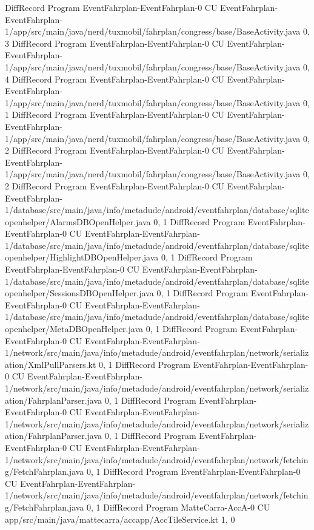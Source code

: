 DiffRecord Program EventFahrplan-EventFahrplan-0 CU EventFahrplan-EventFahrplan-1/app/src/main/java/nerd/tuxmobil/fahrplan/congress/base/BaseActivity.java  {0, 3}
DiffRecord Program EventFahrplan-EventFahrplan-0 CU EventFahrplan-EventFahrplan-1/app/src/main/java/nerd/tuxmobil/fahrplan/congress/base/BaseActivity.java  {0, 4}
DiffRecord Program EventFahrplan-EventFahrplan-0 CU EventFahrplan-EventFahrplan-1/app/src/main/java/nerd/tuxmobil/fahrplan/congress/base/BaseActivity.java  {0, 1}
DiffRecord Program EventFahrplan-EventFahrplan-0 CU EventFahrplan-EventFahrplan-1/app/src/main/java/nerd/tuxmobil/fahrplan/congress/base/BaseActivity.java  {0, 2}
DiffRecord Program EventFahrplan-EventFahrplan-0 CU EventFahrplan-EventFahrplan-1/app/src/main/java/nerd/tuxmobil/fahrplan/congress/base/BaseActivity.java  {0, 2}
DiffRecord Program EventFahrplan-EventFahrplan-0 CU EventFahrplan-EventFahrplan-1/database/src/main/java/info/metadude/android/eventfahrplan/database/sqliteopenhelper/AlarmsDBOpenHelper.java  {0, 1}
DiffRecord Program EventFahrplan-EventFahrplan-0 CU EventFahrplan-EventFahrplan-1/database/src/main/java/info/metadude/android/eventfahrplan/database/sqliteopenhelper/HighlightDBOpenHelper.java  {0, 1}
DiffRecord Program EventFahrplan-EventFahrplan-0 CU EventFahrplan-EventFahrplan-1/database/src/main/java/info/metadude/android/eventfahrplan/database/sqliteopenhelper/SessionsDBOpenHelper.java  {0, 1}
DiffRecord Program EventFahrplan-EventFahrplan-0 CU EventFahrplan-EventFahrplan-1/database/src/main/java/info/metadude/android/eventfahrplan/database/sqliteopenhelper/MetaDBOpenHelper.java  {0, 1}
DiffRecord Program EventFahrplan-EventFahrplan-0 CU EventFahrplan-EventFahrplan-1/network/src/main/java/info/metadude/android/eventfahrplan/network/serialization/XmlPullParsers.kt  {0, 1}
DiffRecord Program EventFahrplan-EventFahrplan-0 CU EventFahrplan-EventFahrplan-1/network/src/main/java/info/metadude/android/eventfahrplan/network/serialization/FahrplanParser.java  {0, 1}
DiffRecord Program EventFahrplan-EventFahrplan-0 CU EventFahrplan-EventFahrplan-1/network/src/main/java/info/metadude/android/eventfahrplan/network/serialization/FahrplanParser.java  {0, 1}
DiffRecord Program EventFahrplan-EventFahrplan-0 CU EventFahrplan-EventFahrplan-1/network/src/main/java/info/metadude/android/eventfahrplan/network/fetching/FetchFahrplan.java  {0, 1}
DiffRecord Program EventFahrplan-EventFahrplan-0 CU EventFahrplan-EventFahrplan-1/network/src/main/java/info/metadude/android/eventfahrplan/network/fetching/FetchFahrplan.java  {0, 1}
DiffRecord Program MatteCarra-AccA-0 CU app/src/main/java/mattecarra/accapp/AccTileService.kt  {1, 0}
